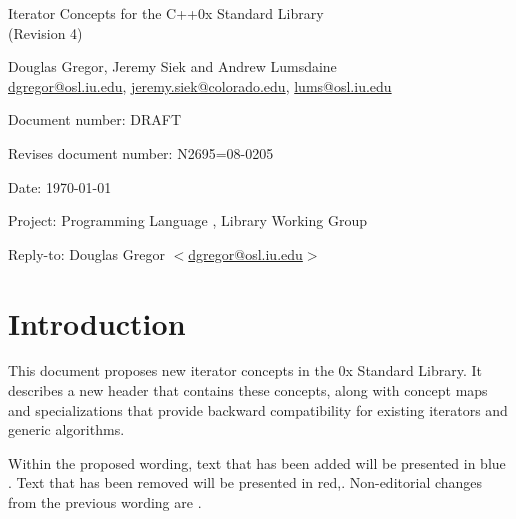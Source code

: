 \documentclass[american,twoside]{book}
\begin{document}
\raggedbottom

\begin{titlepage}
\begin{center}
\huge
Iterator Concepts for the C++0x Standard Library\\
(Revision 4)
\vspace{0.5in}

\normalsize
Douglas Gregor, Jeremy Siek and Andrew Lumsdaine \\
\href{mailto:dgregor@osl.iu.edu}{dgregor@osl.iu.edu}, \href{mailto:jeremy.siek@colorado.edu}{jeremy.siek@colorado.edu}, \href{mailto:lums@osl.iu.edu}{lums@osl.iu.edu}
\end{center}

\vspace{1in}
\par\noindent Document number: DRAFT \vspace{-6pt}
\par\noindent Revises document number: N2695=08-0205 \vspace{-6pt}
\par\noindent Date: \today\vspace{-6pt}
\par\noindent Project: Programming Language \Cpp{}, Library Working Group\vspace{-6pt}
\par\noindent Reply-to: Douglas Gregor $<$\href{mailto:dgregor@osl.iu.edu}{dgregor@osl.iu.edu}$>$\vspace{-6pt}

\section*{Introduction}
This document proposes new iterator concepts in the \Cpp0x Standard
Library. It describes a new header  that
contains these concepts, along with concept maps and
 specializations that provide backward
compatibility for existing iterators and generic algorithms.

Within the proposed wording, text that has been added
\textcolor{addclr}{will be presented in blue} . Text that has been removed will be
presented \textcolor{remclr}{in red},. Non-editorial
changes from the previous wording are . 



\end{titlepage}
\end{document}
